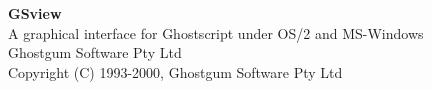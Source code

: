 %
%
\setlength{\textwidth}{160mm}
\setlength{\oddsidemargin}{5mm}
\setlength{\topmargin}{-12mm}
\setlength{\textheight}{240mm}
\setlength{\parskip}{1ex}
\setlength{\parindent}{0pt}


\pagestyle{empty}
   \rule{0in}{3in}
   \begin{center}
   {\huge\bf GSview}\\
   \vspace{3ex}
   {\Large A graphical interface for Ghostscript under OS/2 and MS-Windows}\\
   \vspace{2ex}
   \large
   Ghostgum Software Pty Ltd\\
   \vspace{2ex}
   Copyright (C) 1993-2000, Ghostgum Software Pty Ltd\\
   \end{center}
\newpage

\tableofcontents
\newpage

\setcounter{page}{1}
\pagestyle{myheadings}


